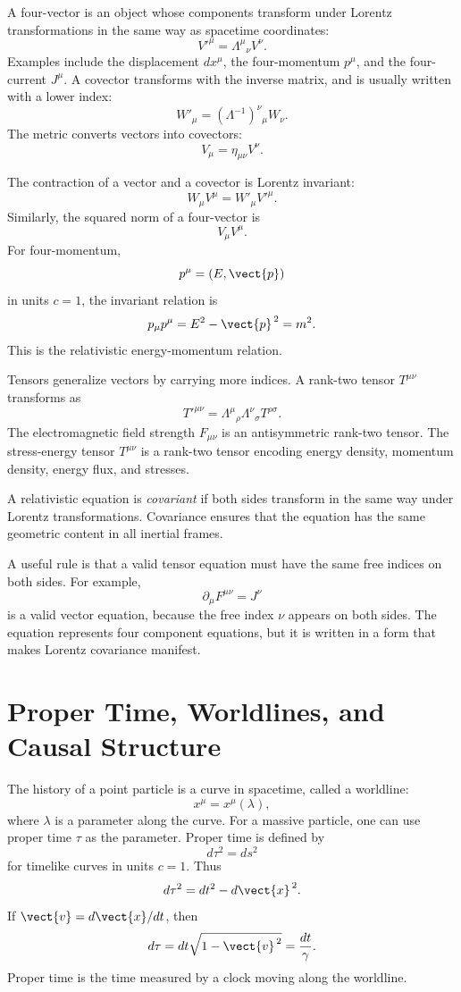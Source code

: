 A four-vector is an object whose components transform under Lorentz
transformations in the same way as spacetime coordinates:
\[
    V'^\mu = \Lambda^\mu{}_{\nu}V^\nu.
\]
Examples include the displacement \(dx^\mu\), the four-momentum \(p^\mu\), and
the four-current \(J^\mu\). A covector transforms with the inverse matrix, and
is usually written with a lower index:
\[
    W'_\mu = (\Lambda^{-1})^\nu{}_{\mu}W_\nu.
\]
The metric converts vectors into covectors:
\[
    V_\mu = \eta_{\mu\nu}V^\nu.
\]

The contraction of a vector and a covector is Lorentz invariant:
\[
    W_\mu V^\mu = W'_\mu V'^\mu.
\]
Similarly, the squared norm of a four-vector is
\[
    V_\mu V^\mu.
\]
For four-momentum,
\[
    p^\mu=(E,\vect{p})
\]
in units \(c=1\), the invariant relation is
\[
    p_\mu p^\mu = E^2-\vect{p}^{\,2}=m^2.
\]
This is the relativistic energy-momentum relation.

Tensors generalize vectors by carrying more indices. A rank-two tensor
\(T^{\mu\nu}\) transforms as
\[
    T'^{\mu\nu}
    = \Lambda^\mu{}_{\rho}\Lambda^\nu{}_{\sigma}T^{\rho\sigma}.
\]
The electromagnetic field strength \(F_{\mu\nu}\) is an antisymmetric rank-two
tensor. The stress-energy tensor \(T^{\mu\nu}\) is a rank-two tensor encoding
energy density, momentum density, energy flux, and stresses.

\begin{definitionbox}
A relativistic equation is \emph{covariant} if both sides transform in the same
way under Lorentz transformations. Covariance ensures that the equation has the
same geometric content in all inertial frames.
\end{definitionbox}

A useful rule is that a valid tensor equation must have the same free indices on
both sides. For example,
\[
    \partial_\mu F^{\mu\nu}=J^\nu
\]
is a valid vector equation, because the free index \(\nu\) appears on both
sides. The equation represents four component equations, but it is written in a
form that makes Lorentz covariance manifest.

\section{Proper Time, Worldlines, and Causal Structure}

The history of a point particle is a curve in spacetime, called a worldline:
\[
    x^\mu=x^\mu(\lambda),
\]
where \(\lambda\) is a parameter along the curve. For a massive particle, one
can use proper time \(\tau\) as the parameter. Proper time is defined by
\[
    d\tau^2 = ds^2
\]
for timelike curves in units \(c=1\). Thus
\[
    d\tau^2 = dt^2-d\vect{x}^{\,2}.
\]
If \(\vect{v}=d\vect{x}/dt\), then
\[
    d\tau = dt\sqrt{1-\vect{v}^{\,2}}
    = \frac{dt}{\gamma}.
\]
Proper time is the time measured by a clock moving along the worldline.

